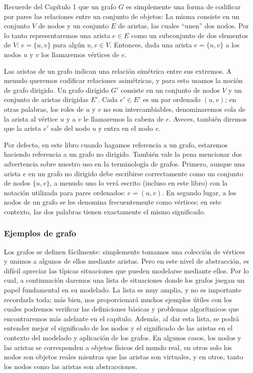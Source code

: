 \documentclass[a4paper, 12pt]{book}
\theoremstyle{dotless}
\begin{document}
Recuerde del Capítulo 1 que un grafo $G$ es simplemente una forma de codificar por pares las relaciones entre un conjunto de objetos: La misma consiste en un conjunto $V$ de nodos y un conjunto $E$ de aristas, las cuales ``unen'' dos nodos. Por lo tanto representaremos una arista $e \in E$ como un subconjunto de dos elementos de $V$: $e = \{u, v\}$ para algún $u, v \in V$.  Entonces, dada una arista $e = \{u, v\}$ a los nodos $u$ y $v$ los llamaremos vértices de $e$.

Las aristas de un grafo indican una relación simétrica entre sus extremos.
A menudo queremos codificar relaciones asimétricas, y para esto usamos la
noción de grafo dirigido. 
Un grafo dirigido $G'$ consiste en un conjunto de nodos $V$ y un conjunto de aristas dirigidas $E'$.  Cada $e' \in E'$ es un par ordenado $(u, v)$; en otras palabras, los roles de $u$ y $v$ no son intercambiables, denominaremos cola de la arista al vértice $u$ y a $v$ le llamaremos la cabeza de $e$. Aveces, también diremos que la arista $e'$ sale del nodo $u$ y entra en el nodo $v$.

Por defecto, en este libro cuando hagamos referencia a un grafo, estaremos haciendo referencia a un grafo no dirigido. También vale la pena mencionar dos advertencia sobre nuestro uso en la terminología de grafos. 
Primero, aunque una arista $e$ en un grafo no dirigido debe escribirse correctamente como un conjunto de nodos $\{u, v\}$,  a menudo uno lo verá escrito (incluso en este libro) con la notación utilizada para pares ordenados: $e = (u,v)$. 
En segundo lugar, a los nodos de un grafo se les denomina frecuentemente como vértices; en este contexto, las dos palabras tienen exactamente el mismo significado. 

\subsubsection{Ejemplos de grafo} 
Los grafos se definen fácilmente: simplemente tomamos una colección de vértices y unimos a algunos de ellos mediante aristas. 
Pero en este nivel de abstracción, es difícil apreciar las típicas situaciones que pueden modelarse mediante ellos. 
Por lo cual, a continuación daremos una lista de situaciones donde los grafos juegan un papel fundamental en su modelado. 
La lista es muy amplia, y no es importante recordarla toda; más bien, nos proporcionará muchos ejemplos útiles con los cuales podremos verificar las definiciones básicas y problemas algorítmicos que encontraremos más adelante en el capítulo. 
Además, al dar esta lista, se podrá entender mejor el significado de los nodos y el significado de las aristas en el contexto del modelado y aplicación de los grafos. 
En algunos casos, los nodos y las aristas se corresponden a objetos físicos del mundo real, en otros solo los nodos son objetos reales mientras que las aristas son virtuales, y en otros, tanto los nodos como las aristas son abstracciones. 
\end{document}
